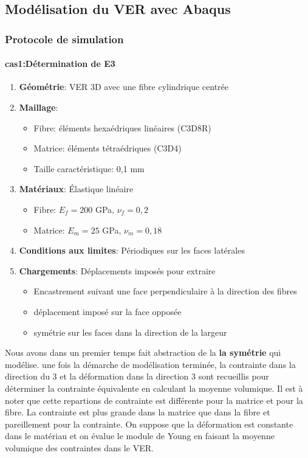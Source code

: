 \documentclass{rapportECL}
\begin{document}
\subsection{Modélisation du VER avec Abaqus}

\subsubsection{Protocole de simulation}
\paragraph{cas1:Détermination de E3}

\begin{enumerate}
\item \textbf{Géométrie}: VER 3D avec une fibre cylindrique centrée
\item \textbf{Maillage}: 
  \begin{itemize}
  \item Fibre: éléments hexaédriques linéaires (C3D8R)
  \item Matrice: éléments tétraédriques (C3D4)
  \item Taille caractéristique: 0,1 mm
  \end{itemize}
\item \textbf{Matériaux}: Élastique linéaire
  \begin{itemize}
  \item Fibre: $E_f = 200$ GPa, $\nu_f = 0,2$
  \item Matrice: $E_m = 25$ GPa, $\nu_m = 0,18$
  \end{itemize}
\item \textbf{Conditions aux limites}: Périodiques sur les faces latérales
\item \textbf{Chargements}: Déplacements imposés pour extraire
  \begin{itemize}
  \item Encastrement suivant une face perpendiculaire à la direction des fibres
  \item déplacement imposé sur la face opposée
  \item symétrie sur les faces dans la direction de la largeur

  \end{itemize}
\end{enumerate}
Nous avons dans un premier temps fait abstraction de la \textbf{la symétrie} qui modélise. une fois la démarche de modélisation terminée, la contrainte dans la direction du 3 et la déformation dans la direction 3 sont recueillis pour déterminer la contrainte équivalente en calculant la moyenne volumique. Il est à noter que cette repartions de contrainte est différente pour la matrice et pour la fibre. La contrainte est plus grande dans la matrice que dans la fibre et pareillement pour la contrainte. On suppose que la déformation est constante dans le matériau et on évalue le module de Young en faisant la moyenne volumique des contraintes dans le VER. 
\end{document}
